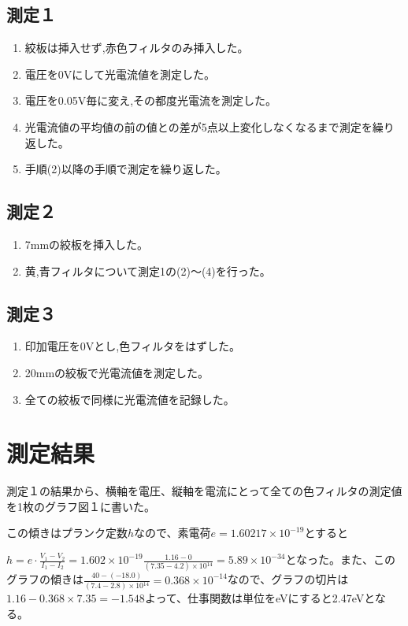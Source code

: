 \documentclass{jsarticle}
\begin{document}
\subsection{測定１}
\begin{enumerate}
\item 絞板は挿入せず,赤色フィルタのみ挿入した。
\item 電圧を0Vにして光電流値を測定した。
\item 電圧を0.05V毎に変え,その都度光電流を測定した。
\item 光電流値の平均値の前の値との差が5点以上変化しなくなるまで測定を繰り返した。
\item 手順(2)以降の手順で測定を繰り返した。
\end{enumerate}
\subsection{測定２}
\begin{enumerate}
\item 7mmの絞板を挿入した。
\item 黄,青フィルタについて測定1の(2)～(4)を行った。
\end{enumerate}
\subsection{測定３}
\begin{enumerate}
\item 印加電圧を0Vとし,色フィルタをはずした。
\item 20mmの絞板で光電流値を測定した。
\item 全ての絞板で同様に光電流値を記録した。
\end{enumerate}


\section{測定結果}

測定１の結果から、横軸を電圧、縦軸を電流にとって全ての色フィルタの測定値を1枚のグラフ図１に書いた。

この傾きはプランク定数$h$なので、素電荷$e = 1.60217 \times 10^{-19}$とすると
\par $h = e\cdot\frac{V_1-V_2}{I_1-I_2} = 1.602\times 10^{-19} \frac{1.16-0}{(7.35-4.2)\times 10{^14}} = 5.89\times 10^{-34}$となった。また、このグラフの傾きは$\frac{40-(-18.0)}{(7.4-2.8)\times 10{^14}} = 0.368\times 10^{-14}$なので、グラフの切片は$1.16 - 0.368\times 7.35 = -1.548$よって、仕事関数は単位をeVにすると2.47eVとなる。
\end{document}
